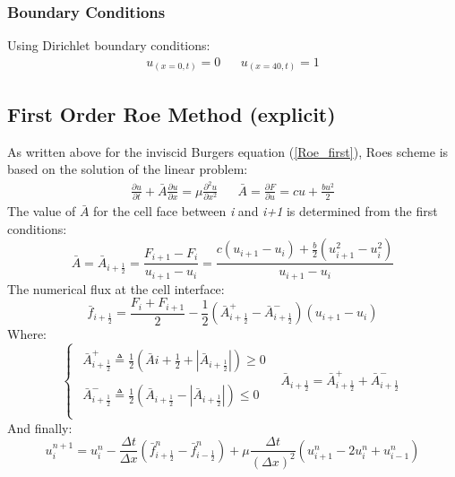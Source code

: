 \documentclass[11pt, a4paper]{article}
\begin{document}
\subsubsection{Boundary Conditions}
Using Dirichlet boundary conditions:
\begin{equation}
    \begin{matrix}
        \displaystyle u_{\left(x=0,t\right)}=0 && \displaystyle u_{\left(x=40,t\right)}=1
    \end{matrix}
\end{equation}

\subsection{First Order Roe Method (explicit)}
As written above for the inviscid Burgers equation (\ref{Roe_first}), Roes scheme is based on the solution of the linear problem:
\begin{equation}
    \begin{matrix}
        \displaystyle\frac{\partial u}{\partial t} + \bar{A}\frac{\partial u}{\partial x} = \mu\frac{\partial^2u}{\partial x^2} && \displaystyle \bar{A}=\frac{\partial F}{\partial u}=cu+\frac{bu^2}{2}
    \end{matrix}         
\end{equation}
The value of $\bar{A}$ for the cell face between \emph{i} and \emph{i+1} is determined from the first conditions:
\begin{equation}
     \bar{A}=\bar{A}_{i+\frac{1}{2}}=\displaystyle\frac{F_{i+1}-F_i}{u_{i+1}-u_i}=\frac{\displaystyle c\left(u_{i+1}-u_i\right)+\frac{b}{2}\left(u_{i+1}^2-u_{i}^2\right)}{u_{i+1}-u_i}
\end{equation}
The numerical flux at the cell interface:
\begin{equation}
    \displaystyle \bar{f}_{i+\frac{1}{2}}=\frac{F_i+F_{i+1}}{2}-\frac{1}{2}\left(\bar{A}_{i+\frac{1}{2}}^+-\bar{A}_{i+\frac{1}{2}}^-\right)\left(u_{i+1}-u_i\right)
\end{equation}
Where:
\begin{equation}
    \left\{\begin{array}{cc}
        \begin{array}{c}
            \bar{A}_{i+\frac{1}{2}}^+\triangleq\displaystyle\frac{1}{2}\left(\bar{A}{i+\frac{1}{2}}+\left|\bar{A}_{i+\frac{1}{2}}\right|\right)\geq0 \\\\
            \bar{A}_{i+\frac{1}{2}}^-\triangleq\displaystyle\frac{1}{2}\left(\bar{A}_{i+\frac{1}{2}}-\left|\bar{A}_{i+\frac{1}{2}}\right|\right)\leq0 \\
        \end{array} & \bar{A}_{i+\frac{1}{2}}=\bar{A}_{i+\frac{1}{2}}^++\bar{A}_{i+\frac{1}{2}}^-
    \end{array}\right.
\end{equation}
And finally:
\begin{equation}
    u_i^{n+1}=u_i^n-\frac{\Delta t}{\Delta x}\left(\bar{f}_{i+\frac{1}{2}}^n-\bar{f}_{i-\frac{1}{2}}^n\right)+\mu\frac{\Delta t}{\left(\Delta x\right)^2}\left(u_{i+1}^n-2u_i^n+u_{i-1}^n\right)
\end{equation}
\end{document}
